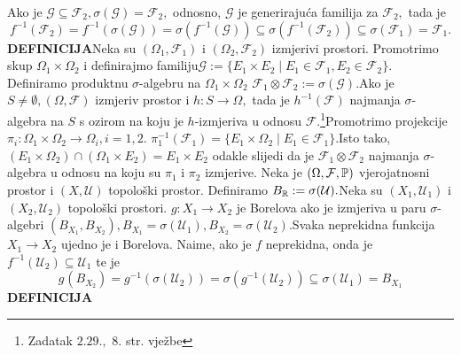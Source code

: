 \documentclass{article}
\begin{document}
Ako je \(\mathcal G\subseteq\mathcal F_2,\sigma(\mathcal G)=\mathcal F_2,\) odnosno, \(\mathcal G\) je generirajuća familija za \(\mathcal F_2,\) tada je \[f^{-1}(\mathcal F_2)=f^{-1}(\sigma(\mathcal G))=\sigma\left(f^{-1}(\mathcal G)\right)\subseteq\sigma(f^{-1}(\mathcal F_2))\subseteq\sigma(\mathcal F_1)=\mathcal F_1.\]  
\textbf{DEFINICIJA}\newline Neka su \((\Omega_1,\mathcal F_1)\) i \((\Omega_2,\mathcal F_2)\) izmjerivi prostori. Promotrimo skup \(\Omega_1\times\Omega_2\) i definirajmo familiju\newline \(\mathcal G:=\{E_1\times E_2\mid E_1\in\mathcal F_1,E_2\in\mathcal F_2\}.\) Definiramo produktnu \(\sigma\)-algebru na \(\Omega_1\times\Omega_2\) \(\mathcal F_1\otimes\mathcal F_2:=\sigma(\mathcal G).\)\newline\newline Ako je \(S\ne\emptyset,(\Omega,\mathcal F)\) izmjeriv prostor i \(h:S\to\Omega,\) tada je \(h^{-1}(\mathcal F)\) najmanja \(\sigma\)-algebra na \(S\) s ozirom na koju je \(h\)-izmjeriva u odnosu \(\mathcal F.\)\footnote[44]{Zadatak \(2.29.,\) \(8.\) str. vježbe}\newline\newline Promotrimo projekcije \(\pi_i:\Omega_1\times\Omega_2\to\Omega_i,i=1,2.\) \(\pi_1^{-1}(\mathcal F_1)=\{E_1\times\Omega_2\mid E_1\in\mathcal F_1\}.\)\newline Isto tako, \((E_1\times\Omega_2)\cap(\Omega_1\times E_2)=E_1\times E_2\) odakle slijedi da je \(\mathcal F_1\otimes\mathcal F_2\) najmanja \(\sigma\)-algebra u odnosu na koju su \(\pi_1\) i \(\pi_2\) izmjerive.\newline\newline
Neka je \((\Omega,\mathcal F,\Bbb P)\) vjerojatnosni prostor i \((X,\mathcal U)\) topološki prostor. Definiramo \(B_{\Bbb R}:=\sigma(\mathcal U).\)\newline\newline Neka su \((X_1,\mathcal U_1)\) i \((X_2,\mathcal U_2)\) topološki prostori. \(g:X_1\to X_2\) je Borelova ako je izmjeriva u paru \(\sigma\)-algebri \(\left(B_{X_1},B_{X_2}\right),B_{X_1}=\sigma(\mathcal U_1),B_{X_2}=\sigma(\mathcal U_2).\)\newline Svaka neprekidna funkcija \(X_1\to X_2\) ujedno je i Borelova. Naime, ako je \(f\) neprekidna, onda je \(f^{-1}(\mathcal U_2)\subseteq\mathcal U_1\) te je \[g^{}\left(B_{X_2}\right)=g^{-1}(\sigma(\mathcal U_2))=\sigma\left(g^{-1}(\mathcal U_2)\right)\subseteq\sigma\left(\mathcal U_1\right)=B_{X_1}\]
\textbf{DEFINICIJA}\newline
\end{document}
